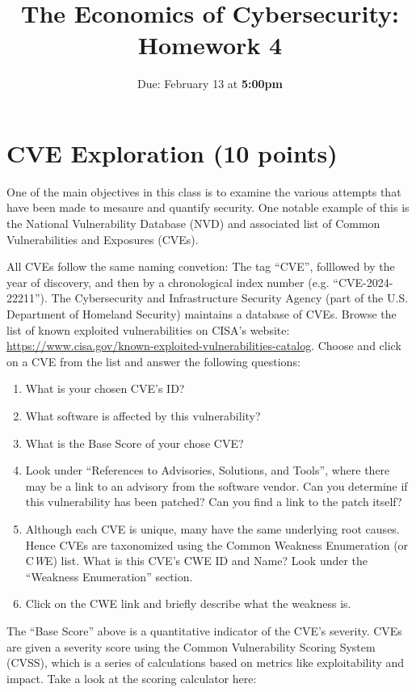 \documentclass[11pt]{article}
\title{The Economics of Cybersecurity: Homework 4}
\date{Due: February 13 at {\bf 5:00pm}}
\author{}
\begin{document}
\maketitle

\section*{CVE Exploration (10 points)}


One of the main objectives in this class is to examine the various attempts that have been made to mesaure and quantify security. 
One notable example of this is the National Vulnerability Database (NVD) and associated list of Common Vulnerabilities and Exposures (CVEs).


All CVEs follow the same naming convetion: The tag ``CVE'', folllowed by the year of discovery, and then by a chronological index number (e.g. ``CVE-2024-22211''). The Cybersecurity and Infrastructure Security Agency (part of the U.S. Department of Homeland Security) maintains a database of CVEs. Browse the list of known exploited vulnerabilities on CISA's website: \href{https://www.cisa.gov/known-exploited-vulnerabilities-catalog}{https://www.cisa.gov/known-exploited-vulnerabilities-catalog}. 
Choose and click on a CVE from the list and answer the following questions:

\begin{enumerate}
    \item What is your chosen CVE's ID?
    \item What software is affected by this vulnerability?
    \item What is the Base Score of your chose CVE?
    \item Look under ``References to Advisories, Solutions, and Tools'', where there may be a link to an advisory from the software vendor. Can you determine if this vulnerability has been patched? Can you find a link to the patch itself? 
    \item Although each CVE is unique, many have the same underlying root causes. Hence CVEs are taxonomized using the Common Weakness Enumeration (or C\textit{W}E) list. What is this CVE's CWE ID and Name? Look under the ``Weakness Enumeration'' section.
    \item Click on the CWE link and briefly describe what the weakness is.
\end{enumerate}

The ``Base Score'' above is a quantitative indicator of the CVE's severity. CVEs are given a severity score using the Common Vulnerability Scoring System (CVSS), which is a series of calculations based on metrics like exploitability and impact. Take a look at the scoring calculator here: 
\end{document}
